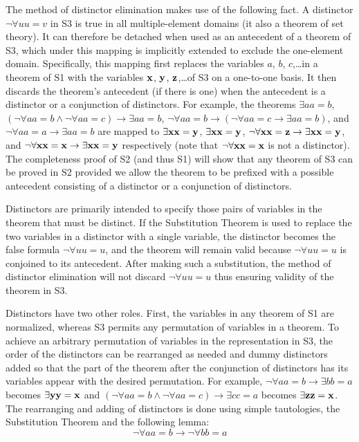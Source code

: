 \documentclass[leqno]{article}
\begin{document}
     The method of distinctor elimination makes use of the following fact.  A
distinctor $\lnot \forall uu=v$ in S3 is true in all multiple-element domains
(it also a theorem of set theory).  It can therefore be detached when used as
an antecedent of a theorem of S3, which under this mapping is implicitly
extended to exclude the one-element domain.  Specifically, this mapping first
replaces the variables $a$, $b$, $c$,\ldots in a theorem of S1 with the
variables ${\bf x}$, ${\bf y}$, ${\bf z}$,\ldots of S3 on a one-to-one basis.
It then discards the theorem's antecedent (if there is one) when the
antecedent is a distinctor or a conjunction of distinctors.  For example, the
theorems $\exists aa=b$, $(\lnot \forall aa=b\wedge \lnot \forall
aa=c)\rightarrow \exists aa=b$, $\lnot \forall aa=b\rightarrow (\lnot \forall
aa=c\rightarrow \exists aa=b)$, and $\lnot \forall aa=a\rightarrow \exists
aa=b$ are mapped to $\exists {\bf x}{\bf x}={\bf y}$, $\exists {\bf x}{\bf
x}={\bf y}$, $\lnot \forall  {\bf x}{\bf x}={\bf z}\rightarrow \exists {\bf
x}{\bf x}={\bf y}$, and $\lnot \forall {\bf x}{\bf x}={\bf x}\rightarrow
\exists {\bf x}{\bf x}={\bf y}$ respectively (note that $\lnot \forall {\bf
x}{\bf x}={\bf x}$ is not a distinctor).  The completeness proof of S2 (and
thus S1) will show that any theorem of S3 can be proved in S2 provided we
allow the theorem to be prefixed with a possible antecedent consisting of a
distinctor or a conjunction of distinctors.

     Distinctors are primarily intended to specify those pairs of variables in
the theorem that must be distinct.  If the Substitution Theorem is used to
replace the two variables in a distinctor with a single variable, the
distinctor becomes the false formula $\lnot \forall uu=u$, and the theorem
will remain valid because $\lnot \forall uu=u$ is conjoined to its
antecedent.  After making such a substitution, the method of distinctor
elimination will not discard $\lnot \forall uu=u$ thus ensuring validity of
the theorem in S3.

     Distinctors have two other roles.  First, the variables in any theorem of
S1 are normalized, whereas S3 permits any permutation of variables in a
theorem.  To achieve an arbitrary permutation of variables in the
representation in S3, the order of the distinctors can be rearranged as needed
and dummy distinctors added so that the part of the theorem after the
conjunction of distinctors has its variables appear with the desired
permutation.  For example, $\lnot \forall aa=b\rightarrow \exists bb=a$
becomes $\exists {\bf y}{\bf y}={\bf x}$ and $(\lnot \forall aa=b\wedge \lnot
\forall aa=c)\rightarrow \exists cc=a$ becomes $\exists {\bf z}{\bf z}={\bf
x}$.  The rearranging and adding of distinctors is done using simple
tautologies, the Substitution Theorem and the following lemma:
\setcounter{equation}{11}
\renewcommand{\theequation}{L\arabic{equation}}
\begin{equation} %
  \lnot \forall aa=b\rightarrow \lnot \forall bb=a
\end{equation}
\end{document}

